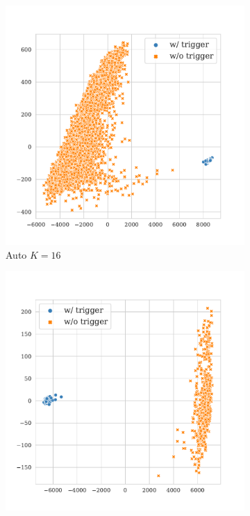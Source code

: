 \begin{figure}[!ht]
\begin{subfigure}{.33\textwidth}
  \centering
  \includegraphics[width=\linewidth]{figures/evaluation_media/tweets-hate-offensive-roberta-large-visual-backdoor-auto-k16-seed42-candidates10-poison-cf-1035.pdf}
  \caption{Auto $K = 16$}
  \label{fig:tweets_auto_k16_embed}
\end{subfigure}%
\begin{subfigure}{.33\textwidth}
  \centering
  \includegraphics[width=\linewidth]{figures/evaluation_media/tweets-hate-offensive-roberta-large-visual-backdoor-auto-k100-seed42-candidates10-poison-cf-1248.pdf}

\end{subfigure}
\end{figure}
